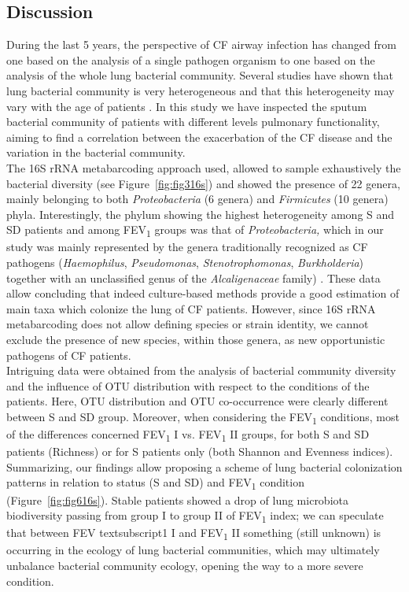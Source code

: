 \subsection{Discussion}
During the last 5 years, the perspective of CF airway infection has changed from one based on the analysis of a single pathogen organism to one based on the analysis of the whole lung bacterial community. Several studies have shown that lung bacterial community is very heterogeneous and that this heterogeneity may vary with the age of patients \cite{cox2010airway, rogers2010determining, willner2009metagenomic, rogers2004characterization}. In this study we have inspected the sputum bacterial community of patients with different levels pulmonary functionality, aiming to find a correlation between the exacerbation of the CF disease and the variation in the bacterial community.\\
The 16S rRNA metabarcoding approach used, allowed to sample exhaustively the bacterial diversity (see Figure~\ref{fig:fig316s}) and showed the presence of 22 genera, mainly belonging to both \textit{Proteobacteria} (6 genera) and \textit{Firmicutes} (10 genera) phyla. Interestingly, the phylum showing the highest heterogeneity among S and SD patients and among FEV\textsubscript{1} groups was that of \textit{Proteobacteria, }which in our study was mainly represented by the genera traditionally recognized as CF pathogens (\textit{Haemophilus}, \textit{Pseudomonas}, \textit{Stenotrophomonas}, \textit{Burkholderia}) together with an unclassified genus of the \textit{Alcaligenaceae }family) \cite{lipuma2010changing}. These data allow concluding that indeed culture-based methods provide a good estimation of main taxa which colonize the lung of CF patients. However, since 16S rRNA metabarcoding does not allow defining species or strain identity, we cannot exclude the presence of new species, within those genera, as new opportunistic pathogens of CF patients.\\
Intriguing data were obtained from the analysis of bacterial community diversity and the influence of OTU distribution with respect to the conditions of the patients. Here, OTU distribution and OTU co-occurrence were clearly different between S and SD group. Moreover, when considering the FEV\textsubscript{1} conditions, most of the differences concerned FEV\textsubscript{1} I vs. FEV\textsubscript{1} II groups, for both S and SD patients (Richness) or for S patients only (both Shannon and Evenness indices).\\
Summarizing, our findings allow proposing a scheme of lung bacterial colonization patterns in relation to status (S and SD) and FEV\textsubscript{1} condition (Figure~\ref{fig:fig616s}). Stable patients showed a drop of lung microbiota biodiversity passing from group I to group II of FEV\textsubscript{1} index; we can speculate that between FEV textsubscript{1} I and FEV\textsubscript{1} II something (still unknown) is occurring in the ecology of lung bacterial communities, which may ultimately unbalance bacterial community ecology, opening the way to a more severe condition.\\
